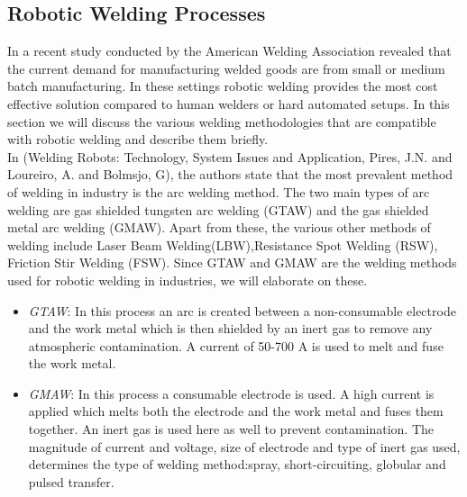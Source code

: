\newpage
\subsection{Robotic Welding Processes}
In a recent study conducted by the American Welding Association revealed that the current demand for manufacturing welded goods are from small or medium batch manufacturing. In these settings robotic welding provides the most cost effective solution compared to human welders or hard automated setups. In this section we will discuss the various welding methodologies that are compatible with robotic welding and describe them briefly.\\
In \cite{6}(Welding Robots: Technology, System Issues and Application, Pires, J.N. and Loureiro,
A. and Bolmsjo, G), the authors state that the most prevalent method of welding in industry is the arc welding method. The two main types of arc welding are gas shielded tungsten arc welding (GTAW) and the gas shielded metal arc welding (GMAW). Apart from these, the various other methods of welding include Laser Beam Welding(LBW),Resistance Spot Welding (RSW), Friction Stir Welding (FSW).
Since GTAW and GMAW are the welding methods used for robotic welding in industries, we will elaborate on these.
\begin{itemize}
\item \textit{GTAW}: In this process an arc is created between a non-consumable electrode and the work metal which is then shielded by an inert gas to remove any atmospheric contamination. A current of 50-700 A is used to melt and fuse the work metal.
\item \textit{GMAW}: In this process a consumable electrode is used. A high current is applied which melts both the electrode and the work metal and fuses them together. An inert gas is used here as well to prevent contamination. The magnitude of current and voltage, size of electrode and type of inert gas used, determines the type of welding method:spray, short-circuiting, globular and pulsed transfer.
\end{itemize}

